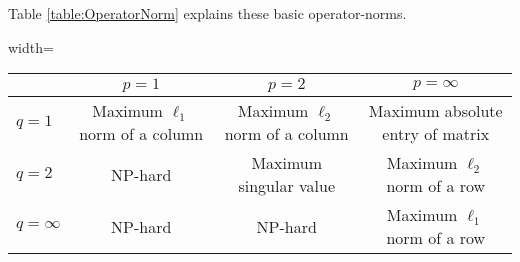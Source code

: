 Table \ref{table:OperatorNorm} explains these basic operator-norms.
\begin{table*}[bp]
\begin{adjustbox}{width=\textwidth} %
\centering
\begin{tabular}{cccc}
\toprule
                              & \multicolumn{1}{c}{$p=1$}  & \multicolumn{1}{c}{$p=2$} & \multicolumn{1}{c}{$p=\infty$} \\ \midrule %
\multicolumn{1}{l}{$q=1$} & \multicolumn{1}{c}{Maximum $\ell_1$ norm of a column} & \multicolumn{1}{c}{Maximum $\ell_2$ norm of a column} & Maximum absolute entry of matrix \\ %
\multicolumn{1}{l}{$q=2$} & \multicolumn{1}{c}{NP-hard} & \multicolumn{1}{c}{Maximum singular value} & Maximum $\ell_2$ norm of a row    \\ %
\multicolumn{1}{l}{$q=\infty$}   & \multicolumn{1}{c}{NP-hard} & \multicolumn{1}{c}{NP-hard} & Maximum $\ell_1$ norm of a row    \\ \bottomrule %
\end{tabular}
\end{adjustbox}
\caption{Computational complexity of $\ell_{q \to p}$ operator-norm for different basic $(q,p)$ pairs \cite{Tropp2004b}.}
\label{table:OperatorNorm}
\end{table*}